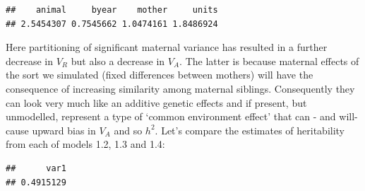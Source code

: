 \documentclass[
  12pt,
]{book}
\newenvironment{Shaded}{\begin{snugshade}}{\end{snugshade}}
\newcommand{\FloatTok}[1]{\textcolor[rgb]{0.00,0.00,0.81}{#1}}
\newcommand{\KeywordTok}[1]{\textcolor[rgb]{0.13,0.29,0.53}{\textbf{#1}}}
\newcommand{\NormalTok}[1]{#1}
\newcommand{\OperatorTok}[1]{\textcolor[rgb]{0.81,0.36,0.00}{\textbf{#1}}}
\newcommand{\StringTok}[1]{\textcolor[rgb]{0.31,0.60,0.02}{#1}}
\begin{document}
\begin{verbatim}
##    animal     byear    mother     units 
## 2.5454307 0.7545662 1.0474161 1.8486924
\end{verbatim}

Here partitioning of significant maternal variance has resulted in a further decrease in \(V_R\) but also a decrease in \(V_A\). The latter is because maternal effects of the sort we simulated (fixed differences between mothers) will have the consequence of increasing similarity among maternal siblings. Consequently they can look very much like an additive genetic effects and if present, but unmodelled, represent a type of `common environment effect' that can - and will- cause upward bias in \(V_A\) and so \(h^2\). Let's compare the estimates of heritability from each of models 1.2, 1.3 and 1.4:

\begin{Shaded}
\end{Shaded}

\begin{verbatim}
##      var1 
## 0.4915129
\end{verbatim}
\end{document}
